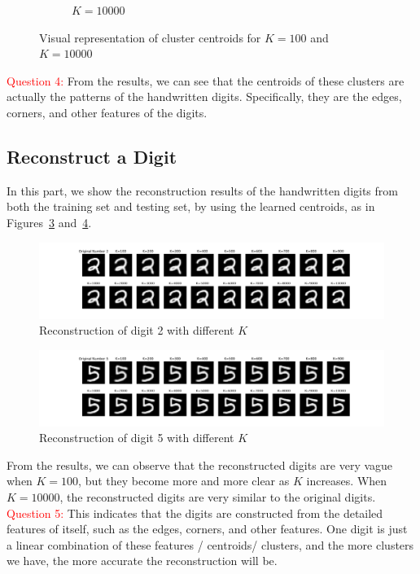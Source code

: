 \documentclass{article}
\begin{document}
\begin{figure}[htbp!]
\begin{subfigure}[b]{0.48\textwidth}
        \caption{$K = 10000$}
        \label{fig:10000-centroids}
    \end{subfigure}
    \caption{Visual representation of cluster centroids for $K = 100$ and $K = 10000$}
    \label{fig:centroids-100-10000}
\end{figure}

\textcolor{red}{Question 4:} From the results, we can see that the centroids of these clusters are actually the patterns of the handwritten digits. Specifically, they are the edges, corners, and other features of the digits.


\subsection{Reconstruct a Digit}
In this part, we show the reconstruction results of the handwritten digits from both the training set and testing set, by using the learned centroids, as in Figures~\ref{fig:digit-train} and~\ref{fig:digit-test}.

\begin{figure}[htbp!]
    \centering
    \includegraphics[width = \textwidth]{../Result/Digits/reconstruct-train-digit.png}
    \caption{Reconstruction of digit 2 with different $K$}
    \label{fig:digit-train}
\end{figure}
\begin{figure}[htbp!]
    \centering
    \includegraphics[width = \textwidth]{../Result/Digits/reconstruct-test-digit.png}
    \caption{Reconstruction of digit 5 with different $K$}
    \label{fig:digit-test}
\end{figure}

From the results, we can observe that the reconstructed digits are very vague when $K = 100$, but they become more and more clear as $K$ increases. 
When $K = 10000$, the reconstructed digits are very similar to the original digits. 
\textcolor{red}{Question 5:} This indicates that the digits are constructed from the detailed features of itself, such as the edges, corners, and other features.
One digit is just a linear combination of these features / centroids/ clusters, and the more clusters we have, the more accurate the reconstruction will be.
\end{document}
